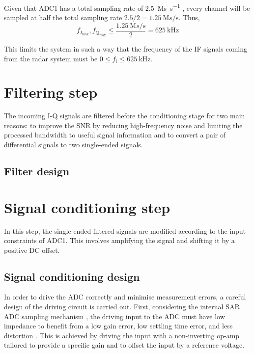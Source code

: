 Given that ADC1 has a total sampling rate of \SI{2.5}{\mega s\per\second} \cite[p.~103]{STMicroelectronics2022}, every channel will be sampled at half the total sampling rate $2.5/2 = \SI{1.25}{\mega s\per\second}$. Thus,
\begin{equation} \label{eqn:nyquist_sampling}
	f_{I_{\max}}, f_{Q_{\max}} \le \frac{\SI{1.25}{\mega s\per\second}}{2} = \SI{625}{\kilo\hertz}
\end{equation}

This limits the system in such a way that the frequency of the IF signals coming from the radar system must be $ 0 \le f_i \le \SI{625}{\kilo\hertz}$.

\section{Filtering step}
The incoming I-Q signals are filtered before the conditioning stage for two main reasons: to improve the SNR by reducing high-frequency noise and limiting the processed bandwidth to useful signal information and to convert a pair of differential signals to two single-ended signals.
\subsection{Filter design}
\section{Signal conditioning step}
In this step, the single-ended filtered signals are modified according to the input constraints of ADC1. This involves amplifying the signal and shifting it by a positive DC offset.
\subsection{Signal conditioning design}
In order to drive the ADC correctly and minimise measurement errors, a careful design of the driving circuit is carried out. First, considering the internal SAR ADC sampling mechanism \cite[pp.~356,~363]{STMicroelectronics2022a}, the driving input to the ADC must have low impedance to benefit from a low gain error, low settling time error, and less distortion \cite{Franco2014}. This is achieved by driving the input with a non-inverting op-amp tailored to provide a specific gain and to offset the input by a reference voltage.

